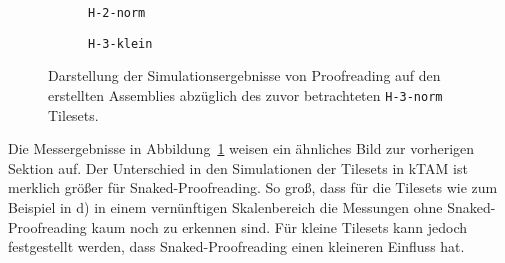 \begin{figure}
\begin{subfigure}[b]{0.49\textwidth}
        \caption{\texttt{H-2-norm}}
    \end{subfigure}
    \begin{subfigure}[b]{0.49\textwidth}
        \caption{\texttt{H-3-klein}}
    \end{subfigure}
    \caption[Simulationsergebnisse für Proofreading-Assemblies]{Darstellung der Simulationsergebnisse von Proofreading auf den erstellten Assemblies abzüglich des zuvor betrachteten \texttt{H-3-norm} Tilesets.}
    \label{fig:proof_simulation}
\end{figure}

Die Messergebnisse in Abbildung~\ref{fig:proof_simulation} weisen ein ähnliches Bild zur vorherigen Sektion auf. Der Unterschied in den Simulationen der Tilesets in kTAM ist merklich größer für Snaked-Proofreading. So groß, dass für die Tilesets wie zum Beispiel in d) in einem vernünftigen Skalenbereich die Messungen ohne Snaked-Proofreading kaum noch zu erkennen sind. Für kleine Tilesets kann jedoch festgestellt werden, dass Snaked-Proofreading einen kleineren Einfluss hat.

